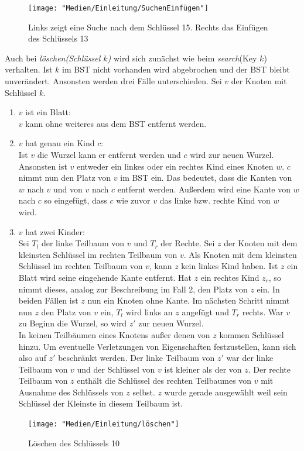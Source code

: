 \documentclass[a4paper,12pt]{article}
\begin{document}
\begin{figure}[h]
	\centering
	\texttt{[image: "Medien/Einleitung/SuchenEinfügen"]}
	\caption{Links zeigt eine Suche nach dem Schlüssel 15. Rechts das Einfügen des Schlüssels 13}
	\label{fig:SuchenEinfügen}
\end{figure}
\noindent Auch bei \textit{löschen(Schlüssel $k$)} wird sich zunächst wie beim  \textit{search}(Key $k$) verhalten. Ist $k$ im BST nicht vorhanden wird abgebrochen und der BST bleibt unverändert. Ansonsten werden drei Fälle unterschieden.
Sei $v$ der Knoten mit Schlüssel $k$.
\begin{enumerate}
	\item $v$ ist ein Blatt: \\
	$v$ kann ohne weiteres aus dem BST entfernt werden.
	\item $v$ hat genau ein Kind $c$:\\
	Ist $v$ die Wurzel kann er entfernt werden und $c$ wird zur neuen Wurzel. Ansonsten ist $v$ entweder ein linkes oder ein rechtes Kind eines Knoten $w$. $c$ nimmt nun den Platz von $v$ im BST ein. Das bedeutet, dass die Kanten von $w$ nach $v$ und von $v$ nach $c$ entfernt werden. Außerdem wird eine Kante von $w$ nach $c$ so eingefügt, dass $c$ wie zuvor $v$ das linke bzw. rechte Kind von $w$ wird. 
	\item $v$ hat zwei Kinder:\\
	Sei $T_l$ der linke Teilbaum von $v$ und $T_r$ der Rechte.
	Sei $z$ der Knoten mit dem kleinsten Schlüssel im rechten Teilbaum von $v$. Als Knoten mit dem kleinsten Schlüssel im rechten Teilbaum von $v$, kann $z$ kein linkes Kind haben. Ist $z$ ein Blatt wird seine eingehende Kante entfernt. Hat $z$ ein rechtes Kind $z_r$, so nimmt dieses, analog zur Beschreibung im Fall 2, den Platz von $z$ ein. In beiden Fällen ist $z$ nun ein Knoten ohne Kante. Im nächsten Schritt nimmt nun $z$ den Platz von $v$ ein, $T_l$ wird links an $z$ angefügt und $T_r$ rechts. War $v$ zu Beginn die Wurzel, so wird $z'$ zur neuen Wurzel.\\
	In keinen Teilbäumen eines Knotens außer denen von $z$ kommen Schlüssel hinzu. Um eventuelle Verletzungen von Eigenschaften festzustellen, kann sich also auf $z'$ beschränkt werden. Der linke Teilbaum von $z'$ war der linke Teilbaum von $v$ und der Schlüssel von $v$ ist kleiner als der von $z$. Der rechte Teilbaum von $z$ enthält die Schlüssel des rechten Teilbaumes von $v$ mit Ausnahme des Schlüssels von $z$ selbst. $z$ wurde gerade ausgewählt weil sein Schlüssel der Kleinste in diesem Teilbaum ist. 
	
	
	
	
\end{enumerate} 
\begin{figure}[h]
	\centering
	\texttt{[image: "Medien/Einleitung/löschen"]}
	\caption{Löschen des Schlüssels 10}
	\label{fig:löschen}
\end{figure}
\end{document}
